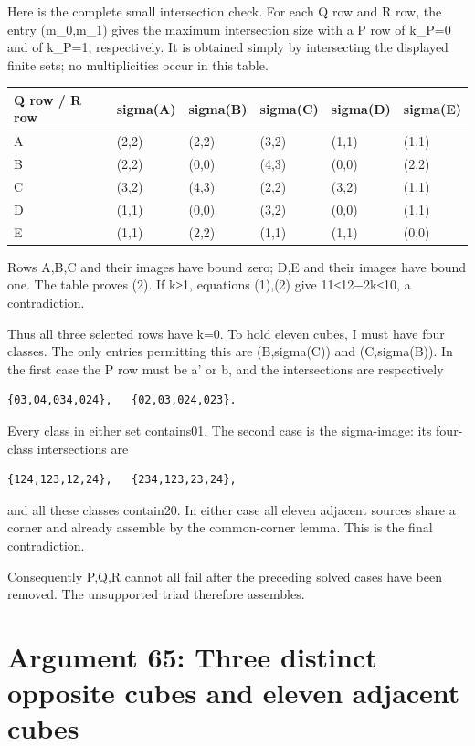\documentclass[
  10pt,
]{article}
\begin{document}
Here is the complete small intersection check. For each Q row and R row,
the entry (m\_0,m\_1) gives the maximum intersection size with a P row
of k\_P=0 and of k\_P=1, respectively. It is obtained simply by
intersecting the displayed finite sets; no multiplicities occur in this
table.

\begin{longtable}[]{@{}llllll@{}}
\toprule\noalign{}
Q row / R row & sigma(A) & sigma(B) & sigma(C) & sigma(D) & sigma(E) \\
\midrule\noalign{}
\endhead
\bottomrule\noalign{}
\endlastfoot
A & (2,2) & (2,2) & (3,2) & (1,1) & (1,1) \\
B & (2,2) & (0,0) & (4,3) & (0,0) & (2,2) \\
C & (3,2) & (4,3) & (2,2) & (3,2) & (1,1) \\
D & (1,1) & (0,0) & (3,2) & (0,0) & (1,1) \\
E & (1,1) & (2,2) & (1,1) & (1,1) & (0,0) \\
\end{longtable}

Rows A,B,C and their images have bound zero; D,E and their images have
bound one. The table proves (2). If k≥1, equations (1),(2) give
11≤12−2k≤10, a contradiction.

Thus all three selected rows have k=0. To hold eleven cubes, I must have
four classes. The only entries permitting this are (B,sigma(C)) and
(C,sigma(B)). In the first case the P row must be a' or b, and the
intersections are respectively

\begin{verbatim}
{03,04,034,024},   {02,03,024,023}.
\end{verbatim}

Every class in either set contains01. The second case is the
sigma-image: its four-class intersections are

\begin{verbatim}
{124,123,12,24},   {234,123,23,24},
\end{verbatim}

and all these classes contain20. In either case all eleven adjacent
sources share a corner and already assemble by the common-corner lemma.
This is the final contradiction.

Consequently P,Q,R cannot all fail after the preceding solved cases have
been removed. The unsupported triad therefore assembles.

\hypertarget{arg-65}{%
\section{Argument 65: Three distinct opposite cubes and eleven adjacent
cubes}\label{arg-65}}
\end{document}
